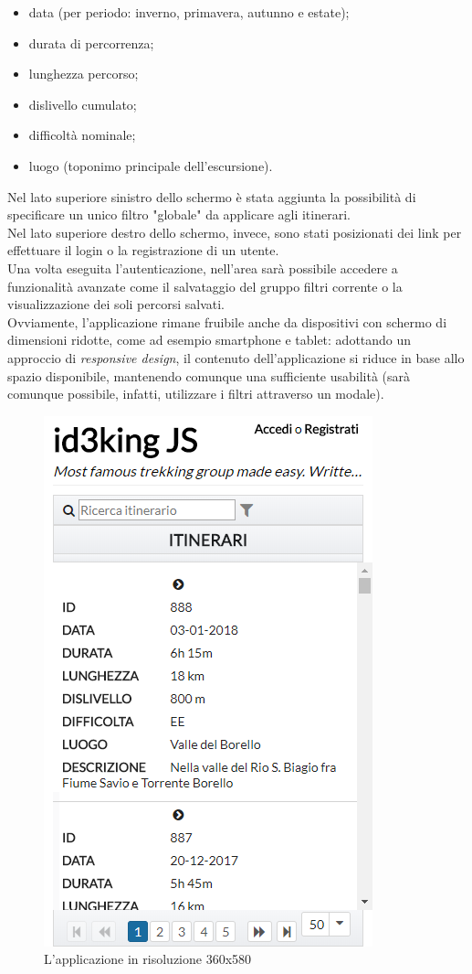 \documentclass[11pt]{report}
\begin{document}
\begin{itemize}
	\item data (per periodo: inverno, primavera, autunno e estate);
	\item durata di percorrenza;
	\item lunghezza percorso;
	\item dislivello cumulato;
	\item difficoltà nominale;
	\item luogo (toponimo principale dell'escursione).
\end{itemize}
Nel lato superiore sinistro dello schermo è stata aggiunta la possibilità di specificare un unico filtro "globale" da applicare agli itinerari.
\\Nel lato superiore destro dello schermo, invece, sono stati posizionati dei link per effettuare il login o la registrazione di un utente.
\\Una volta eseguita l'autenticazione, nell'area sarà possibile accedere a funzionalità avanzate come il salvataggio del gruppo filtri corrente o la visualizzazione dei soli percorsi salvati.
\\Ovviamente, l'applicazione rimane fruibile anche da dispositivi con schermo di dimensioni ridotte, come ad esempio smartphone e tablet: adottando un approccio di \textit{responsive design}, il contenuto dell'applicazione si riduce in base allo spazio disponibile, mantenendo comunque una sufficiente usabilità (sarà comunque possibile, infatti, utilizzare i filtri attraverso un modale).
\begin{figure}[h]
	\centering
	\includegraphics[scale=0.33]{responsive}
	\caption{L'applicazione in risoluzione 360x580 \label{responsive}}
\end{figure}
\pagebreak
\end{document}
